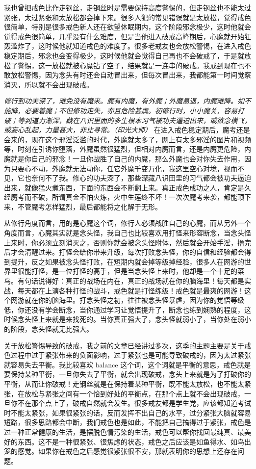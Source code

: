 我也曾把戒色比作走钢丝，走钢丝时是需要保持高度警惕的，但走钢丝也不能太过紧张，太过紧张和太放松都会掉下来。很多人犯的常见错误就是太放松，觉得戒色很简单，特别是很多戒色新人还在欲望休眠期内，这个阶段邪念极少，这时他就会觉得戒色很简单，几乎没有什么难度，但是当他进入破戒高峰期后，心魔就开始狂轰滥炸了，这时候他就知道戒色的难度了。很多老戒友也会放松警惕，在进入戒色稳定期后，邪念也会变得极少，这时候他就会觉得自己再也不会破戒了，于是就放松了警惕，这一放松就被心魔钻了空子，结果就是一连串的破戒。我戒到现在也不敢放松警惕，因为念头有时还会自动冒出来，但每次冒出来，我都能第一时间觉察消灭，所以就不会出现破戒。

\textit{修行到功夫深了，难免没有魔来。魔有内魔，有外魔；外魔易退，内魔难降。如不能降，必要着魔；不但修功走失，亦且危险甚虞。初修行时，小小魔关，容易打破；等到道力渐深，藏在八识里面的多生根本习气被功夫逼迫出来，或欲念横飞，或妄心乱起，力量甚大，非比寻常。（印光大师）} 在进入戒色稳定期后，魔考还是会来的，现在这个邪淫泛滥的时代，外魔就太多了，网上有太多邪淫的图片和视频等，时刻在引诱你堕落，外魔虽然很猛烈，但相对内魔而言，还是内魔更危险，内魔就是你自己的邪念！一旦你战胜了自己的内魔，那么外魔也会对你失去作用，因为只要心不动，外魔就无法动你，任它外魔千变万化，我这里空心对境，视而不见，它也奈何不了我。修心的功夫深了，那些深藏八识田里的习气都会被功夫逼迫出来，就像猛火煮东西，下面的东西会不断翻上来。真正戒色成功之人，肯定是久经魔考而不破，所谓真金不怕火炼，火中生莲终不坏！一次次魔考来袭，都能顶下来，不管魔考怎样猛烈，最后都能将之化解于无形。

从修行角度而言，用的是心魔这个词，修行人必须战胜自己的心魔，而从另外一个角度而言，心魔其实就是念头怪，我自己也比较喜欢用打怪来形容断念，当念头怪上来时，你必须立刻消灭之，否则你就会被念头怪附体，然后就会开始手淫，撸完后才会清醒过来。打怪会给你带来升级，每次打败念头怪，你的自信和经验都会得到提升，反之如果被念头怪打败，在短期内就会掉等级掉经验，很多人在网游的世界里很能打怪，是一位打怪的高手，但是当念头怪上来时，他却是一个十足的菜鸟。有句话说得好：真正的战场在内在，真正的战场就在你的脑海里！每天都是实战，每天都在上演各种打怪的战斗，戒色就是打怪练级！戒色就是最爽的网游！这个网游就在你的脑海里。打念头怪之初，往往被念头怪暴虐，因为你的觉悟等级低，你还没有学会断念，当你通过学习让觉悟提升了，断念也练到娴熟的程度，这时候念头怪上来就是来找死的。当你真正强大了，念头怪就弱小了，当你处在弱小的阶段，念头怪就无比强大。

关于放松警惕导致的破戒，我之前的文章已经讲过多次，这季的主题主要是关于戒色过程中过于紧张带来的负面影响，过于紧张也是可能导致破戒的，因为太过紧张就容易失去平衡。我比较喜欢 balance 这个词，这个词就是平衡的意思，戒色就是要保持某种平衡，一旦你失去了平衡，就会出现破戒，念头上来就是为了打破你的平衡，从而让你破戒！走钢丝就是在保持着某种平衡，既不能太放松，也不能太紧张，在放松与紧张之间有一个恰到好处的平衡点，在那个点上就不会出现破戒，一旦你不在那个点上了，破戒自然就会发生。很多戒友都是学生党，应该都知道考试时不能太紧张，如果很紧张的话，反而发挥不出自己的水平，过分紧张大脑就容易短路，很多思路都会中断，我们戒色也是如此，不能把自己搞得过于紧张，戒色是过一种正常健康的生活，是摆脱色情污染的生活，戒色可以帮你找回最纯真、最美好的东西。这不是一种很紧张、很焦虑的状态，戒色之后应该是如鱼得水、如鸟出笼的感觉。如果你在戒色之后感觉很紧张很不安，那就表明你的思想上还存在问题。

